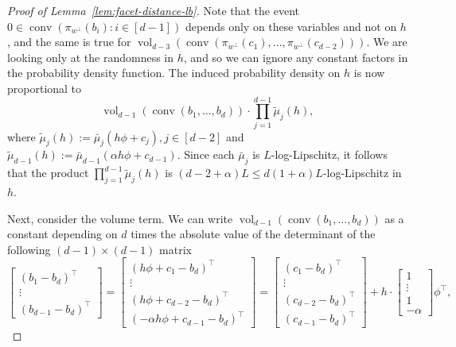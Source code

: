\documentclass{article}\usepackage[a4paper,margin=20mm]{geometry}
\newcommand{\R}{\mathbb R}
\newcommand{\sfe}{\mathbb{S}^{d-1}}
\newcommand{\aff}{\operatorname{affhull}}
\newcommand{\conv}{\operatorname{conv}}
\newcommand{\vol}{\operatorname{vol}}
\begin{document}
\begin{proof}[Proof of Lemma~\ref{lem:facet-distance-lb}]
Note that the event $0 \in \conv(\pi_{w^\perp}(b_i) : i \in [d-1])$ depends only on these variables
and not on $h$, and the same is true for
$\vol_{d-3}(\conv(\pi_{w^\perp}(c_1),\dots,\pi_{w^\perp}(c_{d-2})))$.
We are looking only at the randomness in $h$,
and so we can ignore any constant factors in the probability density function.
The induced probability density on $h$ is now proportional to
\[
    \vol_{d-1}(\conv(b_1,\dots,b_d)) \cdot
    \prod_{j=1}^{d-1} \tilde{\mu}_j(h),
\]
where $\tilde{\mu}_j(h) := \bar{\mu}_j(h\phi + c_j), j \in [d-2]$ and
$\tilde{\mu}_{d-1}(h) := \bar{\mu}_{d-1}(\alpha h \phi + c_{d-1})$.
Since each $\bar{\mu}_j$ is $L$-log-Lipschitz,
it follows that the product $\prod_{j=1}^{d-1} \tilde{\mu}_j(h)$
is $(d-2 + \alpha)L \leq d(1 + \alpha)L$-log-Lipschitz
in $h$.

Next, consider the volume term.
We can write
    $\vol_{d-1}(\conv(b_1,\dots,b_d))$ as a constant depending on $d$ times
    the absolute value of the determinant of the following $(d-1)\times(d-1)$ matrix
    \[
        \begin{bmatrix}
            (b_1 - b_d)^\top \\
            \vdots \\
            (b_{d-1} - b_d)^\top
        \end{bmatrix}
        =
        \begin{bmatrix}
            (h\phi + c_1 - b_d)^\top \\
            \vdots \\
            (h\phi + c_{d-2} - b_d)^\top \\
            (- \alpha h\phi +  c_{d-1} - b_d)^\top 
        \end{bmatrix}
        =
        \begin{bmatrix}
            (c_1 - b_d)^\top \\
            \vdots \\
            (c_{d-2} - b_d)^\top \\
            (c_{d-1} - b_d)^\top
        \end{bmatrix} +
        h\cdot \begin{bmatrix} 1 \\ \vdots \\ 1 \\ -\alpha \end{bmatrix} \phi^\top,
    \]

\end{proof}
\end{document}
